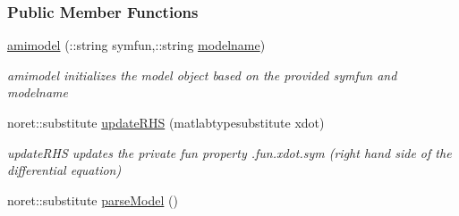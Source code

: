 \subsubsection*{Public Member Functions}
\begin{DoxyCompactItemize}
\item 
\hyperlink{classamimodel_a05d52506788717b3d482845748446a60}{amimodel} (\+::string symfun,\+::string \hyperlink{classamimodel_a71bca9c21a6de42d8079ade31cb61044}{modelname})
\begin{DoxyCompactList}\small\item\em amimodel initializes the model object based on the provided symfun and modelname \end{DoxyCompactList}\item 
noret\+::substitute \hyperlink{classamimodel_aa508c0cd4ac026e464f85cec25678850}{update\+R\+H\+S} (matlabtypesubstitute xdot)
\begin{DoxyCompactList}\small\item\em update\+R\+H\+S updates the private fun property .fun.\+xdot.\+sym (right hand side of the differential equation) \end{DoxyCompactList}\item 
\hypertarget{classamimodel_ae4172c2a8fac8b7c434f03274fcac6ac}{}noret\+::substitute \hyperlink{classamimodel_ae4172c2a8fac8b7c434f03274fcac6ac}{parse\+Model} ()\label{classamimodel_ae4172c2a8fac8b7c434f03274fcac6ac}


\end{DoxyCompactItemize}
